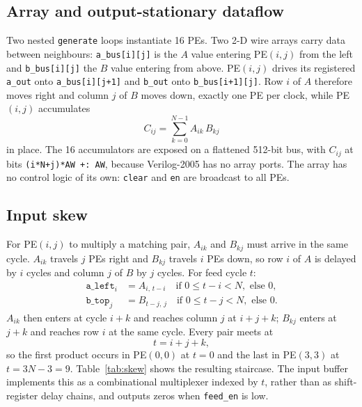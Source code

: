 \documentclass[conference]{IEEEtran}
\newcommand{\code}[1]{\texttt{#1}}
\begin{document}
\subsection{Array and output-stationary dataflow}
Two nested \code{generate} loops instantiate 16 PEs. Two 2-D wire arrays carry
data between neighbours: \code{a\_bus[i][j]} is the $A$ value entering PE$(i,j)$
from the left and \code{b\_bus[i][j]} the $B$ value entering from above. PE$(i,j)$
drives its registered \code{a\_out} onto \code{a\_bus[i][j+1]} and \code{b\_out}
onto \code{b\_bus[i+1][j]}. Row $i$ of $A$ therefore moves right and column $j$
of $B$ moves down, exactly one PE per clock, while PE$(i,j)$ accumulates
\begin{equation}
C_{ij} = \sum_{k=0}^{N-1} A_{ik}\,B_{kj}
\end{equation}
in place. The 16 accumulators are exposed on a flattened 512-bit bus, with
$C_{ij}$ at bits \code{(i*N+j)*AW +: AW}, because Verilog-2005 has no array
ports. The array has no control logic of its own: \code{clear} and \code{en}
are broadcast to all PEs.

\subsection{Input skew}
For PE$(i,j)$ to multiply a matching pair, $A_{ik}$ and $B_{kj}$ must arrive in
the same cycle. $A_{ik}$ travels $j$ PEs right and $B_{kj}$ travels $i$ PEs
down, so row $i$ of $A$ is delayed by $i$ cycles and column $j$ of $B$ by $j$
cycles. For feed cycle $t$:
\begin{equation}
\begin{aligned}
\code{a\_left}_i &= A_{i,\,t-i} \quad \text{if } 0 \le t-i < N, \text{ else } 0,\\
\code{b\_top}_j  &= B_{t-j,\,j} \quad \text{if } 0 \le t-j < N, \text{ else } 0.
\end{aligned}
\end{equation}
$A_{ik}$ then enters at cycle $i+k$ and reaches column $j$ at $i+j+k$; $B_{kj}$
enters at $j+k$ and reaches row $i$ at the same cycle. Every pair meets at
\begin{equation}
t = i + j + k,
\end{equation}
so the first product occurs in PE$(0,0)$ at $t=0$ and the last in PE$(3,3)$ at
$t = 3N-3 = 9$. Table~\ref{tab:skew} shows the resulting staircase. The input
buffer implements this as a combinational multiplexer indexed by $t$, rather
than as shift-register delay chains, and outputs zeros when \code{feed\_en} is
low.
\end{document}
